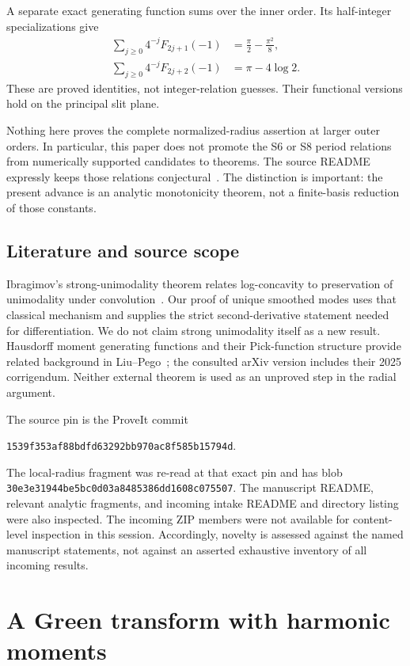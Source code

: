 \documentclass[11pt]{article}
\numberwithin{equation}{section}
\theoremstyle{definition}
\theoremstyle{remark}
\newcommand{\src}[1]{\nolinkurl{#1}}
\newcommand{\repocommit}{\texttt{1539f353af88bdfd63292bb970ac8f585b15794d}}
\begin{document}
A separate exact generating function sums over the inner order. Its
half-integer specializations give
\begin{align}
 \sum_{j\ge0}4^{-j}F_{2j+1}(-1)&=\frac\pi2-\frac{\pi^2}{8},
       \label{eq:introodd}\\
 \sum_{j\ge0}4^{-j}F_{2j+2}(-1)&=\pi-4\log2.
       \label{eq:introeven}
\end{align}
These are proved identities, not integer-relation guesses. Their
functional versions hold on the principal slit plane.

Nothing here proves the complete normalized-radius assertion at larger
outer orders. In particular, this paper does not promote the S6 or S8
period relations from numerically supported candidates to theorems.
The source README expressly keeps those relations conjectural~\cite{repo-readme}.
The distinction is important: the present advance is an analytic
monotonicity theorem, not a finite-basis reduction of those constants.

\subsection{Literature and source scope}
Ibragimov's strong-unimodality theorem relates log-concavity to preservation
of unimodality under convolution~\cite{ibragimov}. Our proof of unique
smoothed modes uses that classical mechanism and supplies the strict
second-derivative statement needed for differentiation. We do not claim
strong unimodality itself as a new result. Hausdorff moment generating
functions and their Pick-function structure provide related background
in Liu--Pego~\cite{liu-pego}; the consulted arXiv version includes their
2025 corrigendum. Neither external theorem is used as an unproved step
in the radial argument.

The source pin is the ProveIt commit
\begin{center}\repocommit.\end{center}
The local-radius fragment was re-read at that exact pin and has blob
\src{30e3e31944be5bc0d03a8485386dd1608c075507}.
The manuscript README, relevant analytic fragments, and incoming intake
README and directory listing were also inspected. The incoming ZIP
members were not available for content-level inspection in this session.
Accordingly, novelty is assessed against the named manuscript statements,
not against an asserted exhaustive inventory of all incoming results.

\section{A Green transform with harmonic moments}
\label{sec:green}
\end{document}
